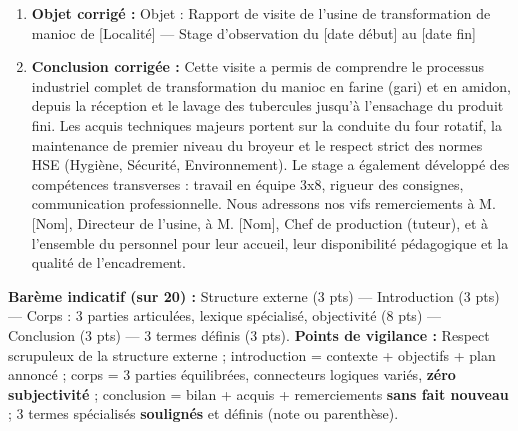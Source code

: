 \documentclass[11pt]{article}
\newcounter{popsec}
\newcounter{popsub}
\newcommand{\courssub}[1]{%
  \stepcounter{popsub}%
  \par\vspace{9pt}\noindent{\popxbold\fontsize{11.5}{13}\selectfont\color{popink}{\color{poporange}\thepopsec.\thepopsub}\hspace{6pt}#1}\par\nopagebreak\vspace{4pt}
}
\begin{document}
\begin{corrige}
\begin{enumerate}
\begin{center}
\begin{tabularx}{\linewidth}{|l|X|X|}
\end{tabularx}
\end{center}
\item \textbf{Objet corrigé :} \og Objet : Rapport de visite de l'usine de transformation de manioc de [Localité] — Stage d'observation du [date début] au [date fin] \fg
\item \textbf{Conclusion corrigée :}
\og Cette visite a permis de comprendre le processus industriel complet de transformation du manioc en farine (gari) et en amidon, depuis la réception et le lavage des tubercules jusqu'à l'ensachage du produit fini. Les acquis techniques majeurs portent sur la conduite du four rotatif, la maintenance de premier niveau du broyeur et le respect strict des normes HSE (Hygiène, Sécurité, Environnement). Le stage a également développé des compétences transverses : travail en équipe 3x8, rigueur des consignes, communication professionnelle. Nous adressons nos vifs remerciements à M. [Nom], Directeur de l'usine, à M. [Nom], Chef de production (tuteur), et à l'ensemble du personnel pour leur accueil, leur disponibilité pédagogique et la qualité de l'encadrement. \fg
\end{enumerate}
\end{corrige}

\courssub{Je me prépare au Bac}

\begin{corrige}
\textbf{Barème indicatif (sur 20) :} Structure externe (3 pts) — Introduction (3 pts) — Corps : 3 parties articulées, lexique spécialisé, objectivité (8 pts) — Conclusion (3 pts) — 3 termes définis (3 pts). \textbf{Points de vigilance :} Respect scrupuleux de la structure externe ; introduction = contexte + objectifs + plan annoncé ; corps = 3 parties équilibrées, connecteurs logiques variés, \textbf{zéro subjectivité} ; conclusion = bilan + acquis + remerciements \textbf{sans fait nouveau} ; 3 termes spécialisés \textbf{soulignés} et définis (note ou parenthèse).
\end{corrige}
\end{document}
